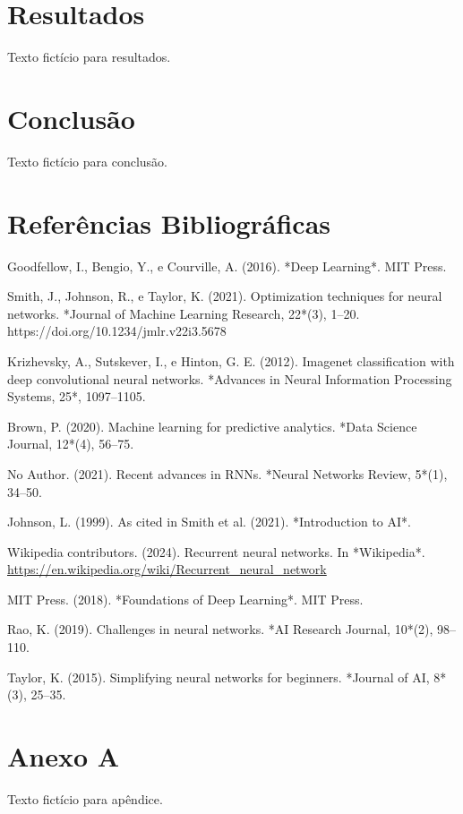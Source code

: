 \documentclass[a4paper,12pt]{report}
\begin{document}
	\chapter{Resultados}
	Texto fictício para resultados. 
	\lipsum[7-8]
	
	\chapter{Conclusão}
	Texto fictício para conclusão. 
	\lipsum[9]
	
	\chapter*{Referências Bibliográficas}
	
	\begin{thebibliography}{}
		
		Goodfellow, I., Bengio, Y., e Courville, A. (2016). *Deep Learning*. MIT Press.
		
		Smith, J., Johnson, R., e Taylor, K. (2021). Optimization techniques for neural networks. *Journal of Machine Learning Research, 22*(3), 1–20. https://doi.org/10.1234/jmlr.v22i3.5678
		
		Krizhevsky, A., Sutskever, I., e Hinton, G. E. (2012). Imagenet classification with deep convolutional neural networks. *Advances in Neural Information Processing Systems, 25*, 1097–1105.
		
		Brown, P. (2020). Machine learning for predictive analytics. *Data Science Journal, 12*(4), 56–75.
		
		No Author. (2021). Recent advances in RNNs. *Neural Networks Review, 5*(1), 34–50.
		
		Johnson, L. (1999). As cited in Smith et al. (2021). *Introduction to AI*.
		
		Wikipedia contributors. (2024). Recurrent neural networks. In *Wikipedia*. \url{https://en.wikipedia.org/wiki/Recurrent_neural_network}
		
		MIT Press. (2018). *Foundations of Deep Learning*. MIT Press.
		
		Rao, K. (2019). Challenges in neural networks. *AI Research Journal, 10*(2), 98–110.
		
		Taylor, K. (2015). Simplifying neural networks for beginners. *Journal of AI, 8*(3), 25–35.
		
	\end{thebibliography}

	
	\appendix
	\chapter{Anexo A}
	Texto fictício para apêndice. 
	\lipsum[10]
	
\end{document}
